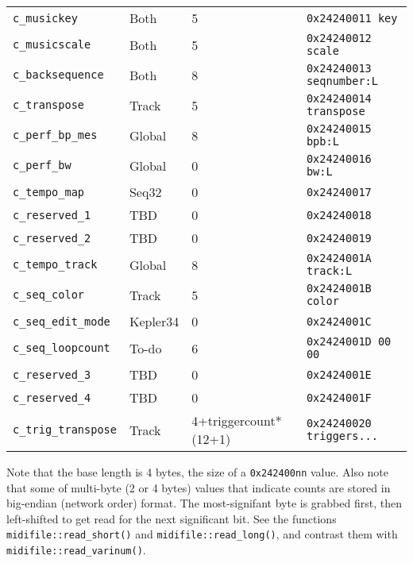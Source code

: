 \begin{table}[htb]
\begin{tabular}{l l l l}
         \texttt{c\_musickey}        & Both          & 5                 & \texttt{0x24240011 key} \\
         \texttt{c\_musicscale}      & Both          & 5                 & \texttt{0x24240012 scale} \\
         \texttt{c\_backsequence}    & Both          & 8                 & \texttt{0x24240013 seqnumber:L} \\
         \texttt{c\_transpose}       & Track         & 5                 & \texttt{0x24240014 transpose} \\
         \texttt{c\_perf\_bp\_mes}   & Global        & 8                 & \texttt{0x24240015 bpb:L} \\
         \texttt{c\_perf\_bw}        & Global        & 0                 & \texttt{0x24240016 bw:L} \\
         \texttt{c\_tempo\_map}      & Seq32         & 0                 & \texttt{0x24240017} \\
         \texttt{c\_reserved\_1}     & TBD           & 0                 & \texttt{0x24240018} \\
         \texttt{c\_reserved\_2}     & TBD           & 0                 & \texttt{0x24240019} \\
         \texttt{c\_tempo\_track}    & Global        & 8                 & \texttt{0x2424001A track:L} \\
         \texttt{c\_seq\_color}      & Track         & 5                 & \texttt{0x2424001B color} \\
         \texttt{c\_seq\_edit\_mode} & Kepler34      & 0                 & \texttt{0x2424001C} \\
         \texttt{c\_seq\_loopcount}  & To-do         & 6                 & \texttt{0x2424001D 00 00} \\
         \texttt{c\_reserved\_3}     & TBD           & 0                 & \texttt{0x2424001E} \\
         \texttt{c\_reserved\_4}     & TBD           & 0                 & \texttt{0x2424001F} \\
         \texttt{c\_trig\_transpose} & Track     & 4+triggercount*(12+1) & \texttt{0x24240020 triggers...} \\
      \end{tabular}
   \end{table}

   Note that the base length is 4 bytes, the size of a \texttt{0x242400nn}
   value.  Also note that some of multi-byte (2 or 4 bytes) values that
   indicate counts are stored in big-endian (network order) format.  The
   most-signifant byte is grabbed first, then
   left-shifted to get read for the next significant bit.
   See the functions
   \texttt{midifile::read\_short()} and
   \texttt{midifile::read\_long()}, and contrast them with
   \texttt{midifile::read\_varinum()}.

